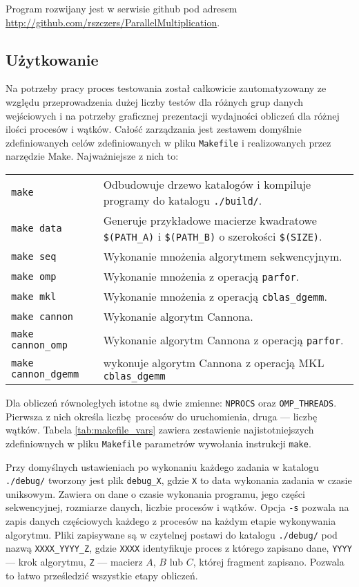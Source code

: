 Program rozwijany jest w serwisie github pod adresem \url{http://github.com/rszczers/ParallelMultiplication}.


\subsection{Użytkowanie}
Na potrzeby pracy proces testowania został całkowicie zautomatyzowany ze względu przeprowadzenia dużej liczby testów dla różnych grup danych wejściowych i na potrzeby graficznej prezentacji wydajności obliczeń dla różnej ilości procesów i wątków. Całość zarządzania jest zestawem domyślnie zdefiniowanych celów zdefiniowanych w pliku \texttt{Makefile} i realizowanych przez narzędzie Make. Najważniejsze z nich to:
\vspace{5mm}


\noindent\begin{tabular}{L{4cm}L{9cm}}
\texttt{make} & Odbudowuje drzewo katalogów i kompiluje programy do katalogu \texttt{./build/}. \\
\texttt{make data} & Generuje przykładowe macierze kwadratowe \texttt{\$(PATH\_A)} i \texttt{\$(PATH\_B)} o szerokości \texttt{\$(SIZE)}. \\
\texttt{make seq} & Wykonanie mnożenia algorytmem sekwencyjnym. \\
\texttt{make omp} & Wykonanie mnożenia z operacją \texttt{parfor}. \\
\texttt{make mkl} & Wykonanie mnożenia z operacją \texttt{cblas\_dgemm}. \\
\texttt{make cannon} & Wykonanie algorytm Cannona.\\
\texttt{make cannon\_omp} & Wykonanie algorytm Cannona z operacją \texttt{parfor}.\\ 
\texttt{make cannon\_dgemm} & wykonuje algorytm Cannona z operacją MKL \texttt{cblas\_dgemm}
\end{tabular}


\vspace{5mm}
Dla obliczeń równoległych istotne są dwie zmienne: \texttt{NPROCS} oraz \texttt{OMP\_THR\-EADS}. Pierwsza z nich określa liczbę procesów do uruchomienia, druga --- liczbę wątków. Tabela \ref{tab:makefile_vars} zawiera zestawienie najistotniejszych zdefiniownych w pliku \texttt{Makefile} parametrów wywołania instrukcji \texttt{make}.


Przy domyślnych ustawieniach po wykonaniu każdego zadania w katalogu \texttt{./debug/} tworzony jest plik \texttt{debug\_X}, gdzie \texttt{X} to data wykonania zadania w czasie uniksowym. Zawiera on dane o czasie wykonania programu, jego części sekwencyjnej, rozmiarze danych, liczbie procesów i wątków. Opcja \texttt{-s} pozwala na zapis danych częściowych każdego z procesów na każdym etapie wykonywania algorytmu. Pliki zapisywane są w czytelnej postawi do katalogu \texttt{./debug/} pod nazwą \texttt{XXXX\_YYYY\_Z}, gdzie \texttt{XXXX} identyfikuje proces z którego zapisano dane, \texttt{YYYY} --- krok algorytmu, \texttt{Z} --- macierz \(A\), \(B\) lub \(C\), której fragment zapisano. Pozwala to łatwo prześledzić wszystkie etapy obliczeń.

